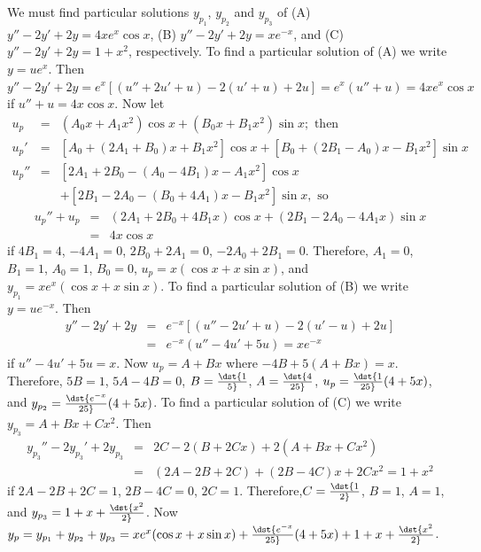 \documentclass[dvips]{book}
\renewcommand{\exer}[1]{\par\medskip\;\noindent{\color{red}\bf #1.}}
\numberwithin{example}{section}
\numberwithin{equation}{section}
\numberwithin{theorem}{section}
\numberwithin{table}{section}
\numberwithin{figure}{section}
\begin{document}
\exer{5.5.30}
We must find particular solutions $y_{p_1}$, $y_{p_2}$ and $y_{p_3}$
of
(A) $y''-2y'+2y=4xe^x\cos x$,
(B) $y''-2y'+2y=xe^{-x}$, and
(C) $y''-2y'+2y=1+x^2$, respectively.
To find a particular solution of (A) we write $y=ue^x$. Then
$y''-2y'+2y=e^x\left[(u''+2u'+u)-2(u'+u)+2u\right]=e^x(u''+u)=
4xe^x\cos x$ if $u''+u=4x\cos x$. Now let
\begin{eqnarray*}
u_p&=&(A_0x+A_1x^2)\cos x+(B_0x+B_1x^2)\sin x;\mbox{ then}\\
u_p'&=&\left[A_0+(2A_1+B_0)x+B_1x^2\right]\cos x
+\left[B_0+(2B_1-A_0)x-B_1x^2\right]\sin x\\
u_p''&=&
\left[2A_1+2B_0-(A_0-4B_1)x-A_1x^2\right]\cos x\\ &&+
\left[2B_1-2A_0-(B_0+4A_1)x-B_1x^2\right]\sin x, \mbox{ so}
\end{eqnarray*}
\begin{eqnarray*}
u_p''+u_p&=&(2A_1+2B_0+4B_1x)\cos x+(2B_1-2A_0-4A_1x)\sin x\\ &=&
4x\cos x
\end{eqnarray*}
if $4B_1=4$, $-4A_1=0$, $2B_0+2A_1=0$, $-2A_0+2B_1=0$. Therefore,
$A_1=0$, $B_1=1$, $A_0=1$, $B_0=0$, $u_p=x(\cos x+x\sin x)$, and
$y_{p_1}=xe^x(\cos x+x\sin x)$. To find a particular solution of (B)
we write $y=ue^{-x}$. Then
\begin{eqnarray*}
y''-2y'+2y&=&e^{-x}\left[(u''-2u'+u)-2(u'-u)+2u\right]\\ &=&
e^{-x}(u''-4u'+5u)=xe^{-x}
\end{eqnarray*}
if $u''-4u'+5u=x$. Now $u_p=A+Bx$ where $-4B+5(A+Bx)=x$. Therefore,
$5B=1$, $5A-4B=0$, $B=\dst{1\over5}$, $A=\dst{4\over25}$,
$u_p=\dst{1\over25}(4+5x)$, and $y_{p_2}=\dst{e^{-x}\over25}(4+5x)$.
To find a particular solution of (C) we write $y_{p_3}=A+Bx+Cx^2$.
Then
\begin{eqnarray*}
y_{p_3}''-2y_{p_3}'+2y_{p_3}&=&2C-2(B+2Cx)+2(A+Bx+Cx^2)\\ &=&
(2A-2B+2C)+(2B-4C)x+2Cx^2=1+x^2
\end{eqnarray*}
if $2A-2B+2C=1$, $2B-4C=0$, $2C=1$. Therefore,$C=\dst{1\over2}$,
$B=1$, $A=1$, and $y_{p_3}=1+x+\dst{x^2\over2}$. Now
$y_p=y_{p_1}+y_{p_2}+y_{p_3}= xe^x(\cos x+x\sin
x)+\dst{e^{-x}\over25}(4+5x)+1+x+\dst{x^2\over2}$.
\end{document}
